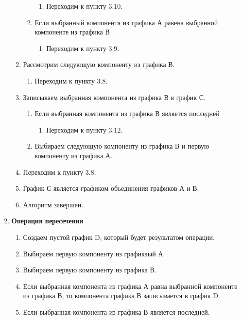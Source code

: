 \documentclass[a4paper,12pt]{extarticle}
\begin{document}
\begin{enumerate}
\begin{enumerate}[label*=\arabic*.]
\begin{enumerate}[label*=\arabic*.]
      \begin{enumerate}[label*=\arabic*.]
        \item Переходим к пункту 3.10.
      \end{enumerate}
      \item Если выбранный компонента из графика А равена выбранной компоненте из графика В
      \begin{enumerate}[label*=\arabic*.]
        \item Переходим к пункту 3.9.
      \end{enumerate}
    \end{enumerate}
    \item Рассмотрим следующую компоненту из графика В.
    \begin{enumerate}[label*=\arabic*.]
      \item Переходим к пункту 3.8.
    \end{enumerate}
    \item Записываем выбранная компонента из графика В в график С.
    \begin{enumerate}[label*=\arabic*.]
      \item Если выбранная компонента из графика В является последней
      \begin{enumerate}[label*=\arabic*.]
        \item Переходим к пункту 3.12.
      \end{enumerate}
      \item Выбираем следующую компоненту из графика В и первую компоненту из графика А.
    \end{enumerate}
    \item Переходим к пункту 3.8.
    \item График С является графиком объединения графиков А и В.
    \item Алгоритм завершен.
  \end{enumerate}
  \item \textbf{Операция пересечения}
  \begin{enumerate}[label*=\arabic*.]
    \item Создаем пустой график D, который будет результатом операции.
    \item Выбираем первую компоненту из графикаый  А.
    \item Выбираем первую компоненту из графика В.
    \item Если выбранная компонента из графика А равна выбранной компоненте из графика В, то компонента графика В записывается в график D.
    \item Если выбранная компонента из графика В является последней.

\end{enumerate}
\end{enumerate}
\end{document}
